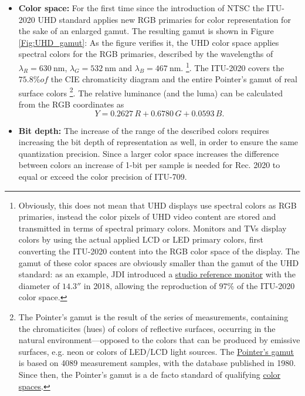 \begin{itemize}
\item \textbf{Color space:} 
For the first time since the introduction of NTSC the ITU-2020 UHD standard applies new RGB primaries for color representation for the sake of an enlarged gamut.
The resulting gamut is shown in Figure \ref{Fig:UHD_gamut}: 
As the figure verifies it, the UHD color space applies spectral colors for the RGB primaries, described by the wavelengths of $\lambda_R = 630~\mathrm{nm}$, $\lambda_G =532~\mathrm{nm}$ and $\lambda_B =467~\mathrm{nm}$.
\footnote{
Obviously, this does not mean that UHD displays use spectral colors as RGB primaries, instead the color pixels of UHD video content are stored and transmitted in terms of spectral primary colors.
Monitors and TVs display colors by using the actual applied LCD or LED primary colors, first converting the ITU-2020 content into the RGB color space of the display.
The gamut of these color spaces are obviously smaller than the gamut of the UHD standard: as an example, JDI introduced a \href{https://www.displaydaily.com/?view=article&id=62235:jdi-may-have-commercial-problems-but-has-technical-highlights}{studio reference monitor} with the diameter of $14.3''$ in 2018, allowing the reproduction of $97\%$ of the ITU-2020 color space.}.
The ITU-2020 covers the $75.8\% of$ the CIE chromaticity diagram and the entire Pointer's gamut of real surface colors
\footnote{
The Pointer's gamut is the result of the series of measurements, containing the chromaticites (hues) of colors of reflective surfaces, occurring in the natural environment---opposed to the colors that can be produced by emissive surfaces, e.g. neon or colors of LED/LCD light sources.
The \href{https://cinepedia.com/picture/color-gamut/}{Pointer's gamut} is based on 4089 measurement samples, with the database published in 1980.
Since then, the Pointer's gamut is a de facto standard of qualifying \href{https://www.tftcentral.co.uk/articles/pointers_gamut.htm}{color spaces}.}.
The relative luminance (and the luma) can be calculated from the RGB coordinates as 
\begin{equation}
Y = 0.2627 \, R + 0.6780 \, G + 0.0593 \, B.
\label{eq:2020_Y}
\end{equation}
\item \textbf{Bit depth:} 
The increase of the range of the described colors requires increasing the bit depth of representation as well, in order to ensure the same quantization precision.
Since a larger color space increases the difference between colors an increase of 1-bit per sample is needed for Rec. 2020 to equal or exceed the color precision of ITU-709.

\end{itemize}
